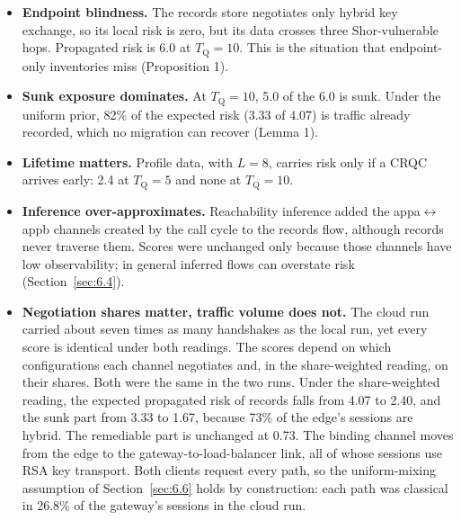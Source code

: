 \documentclass[conference]{IEEEtran}
\newcommand{\Tq}{T_{\mathrm{Q}}}
\begin{document}
\begin{itemize}
\item \textbf{Endpoint blindness.} The records store negotiates only hybrid key exchange, so its local risk is zero, but its data crosses three Shor-vulnerable hops. Propagated risk is 6.0 at $\Tq = 10$. This is the situation that endpoint-only inventories miss (Proposition 1).
\item \textbf{Sunk exposure dominates.} At $\Tq = 10$, 5.0 of the 6.0 is sunk. Under the uniform prior, 82\% of the expected risk (3.33 of 4.07) is traffic already recorded, which no migration can recover (Lemma 1).
\item \textbf{Lifetime matters.} Profile data, with $L = 8$, carries risk only if a CRQC arrives early: 2.4 at $\Tq = 5$ and none at $\Tq = 10$.
\item \textbf{Inference over-approximates.} Reachability inference added the appa$\leftrightarrow$appb channels created by the call cycle to the records flow, although records never traverse them. Scores were unchanged only because those channels have low observability; in general inferred flows can overstate risk (Section~\ref{sec:6.4}).
\item \textbf{Negotiation shares matter, traffic volume does not.} The cloud run carried about seven times as many handshakes as the local run, yet every score is identical under both readings. The scores depend on which configurations each channel negotiates and, in the share-weighted reading, on their shares. Both were the same in the two runs. Under the share-weighted reading, the expected propagated risk of records falls from 4.07 to 2.40, and the sunk part from 3.33 to 1.67, because 73\% of the edge's sessions are hybrid. The remediable part is unchanged at 0.73. The binding channel moves from the edge to the gateway-to-load-balancer link, all of whose sessions use RSA key transport. Both clients request every path, so the uniform-mixing assumption of Section~\ref{sec:6.6} holds by construction: each path was classical in 26.8\% of the gateway's sessions in the cloud run.
\end{itemize}
\end{document}
